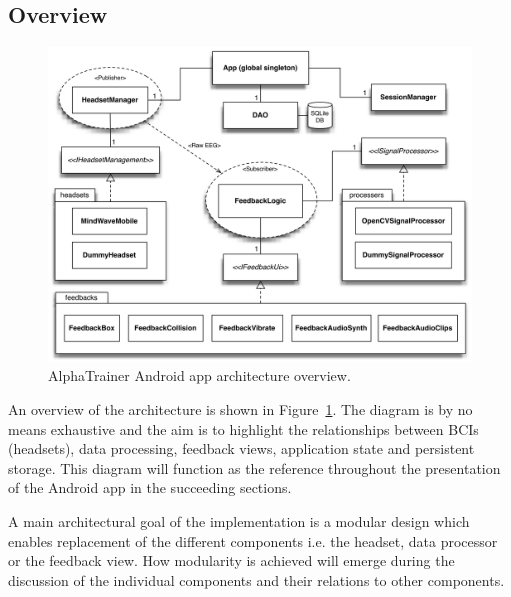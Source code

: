 \documentclass[a4paper,10pt,english,lof,lot,twoside]{puthesis}
\begin{document}
\subsection{Overview}
\label{ch-implementation/index:overview}\begin{figure}[tbp]
\centering
\capstart

\includegraphics[width=1.000\linewidth]{alphatrainer-android-app-architecture.png}
\caption[AlphaTrainer Android app architecture overview]{AlphaTrainer Android app architecture overview.}\label{ch-implementation/index:fig-implementation-alphatrainer-android-app-architecture}\end{figure}

An overview of the architecture is shown in Figure \ref{ch-implementation/index:fig-implementation-alphatrainer-android-app-architecture}. The diagram is
by no means exhaustive and the aim is to highlight the relationships between
BCIs (headsets), data processing, feedback views, application state and
persistent storage. This diagram will function as the reference throughout the
presentation of the Android app in the succeeding sections.

A main architectural goal of the implementation is a modular design which
enables replacement of the different components i.e. the headset, data processor
or the feedback view. How modularity is achieved will emerge during the
discussion of the individual components and their relations to other components.
\end{document}

